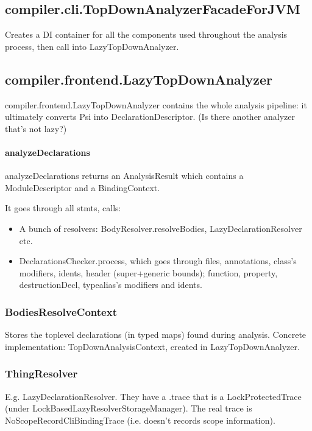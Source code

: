 \documentclass{article}
\begin{document}
\subsection{compiler.cli.TopDownAnalyzerFacadeForJVM}

Creates a DI container for all the components used throughout the analysis process, then call into LazyTopDownAnalyzer.

\subsection{compiler.frontend.LazyTopDownAnalyzer}

compiler.frontend.LazyTopDownAnalyzer contains the whole analysis pipeline: it ultimately converts Psi into DeclarationDescriptor. (Is there another analyzer that's not lazy?)

\paragraph{analyzeDeclarations}

analyzeDeclarations returns an AnalysisResult which contains a ModuleDescriptor and a BindingContext.

It goes through all stmts, calls:
\begin{itemize}
    \item A bunch of resolvers: BodyResolver.resolveBodies, LazyDeclarationResolver etc.
    \item DeclarationsChecker.process, which goes through files, annotations, class's modifiers, idents, header (super+generic bounds); function, property, destructionDecl, typealias's modifiers and idents.
\end{itemize}

\subsubsection{BodiesResolveContext}

Stores the toplevel declarations (in typed maps) found during analysis. Concrete implementation: TopDownAnalysisContext, created in LazyTopDownAnalyzer.

\subsubsection{ThingResolver}
E.g. LazyDeclarationResolver. They have a .trace that is a LockProtectedTrace (under LockBasedLazyResolverStorageManager). The real trace is NoScopeRecordCliBindingTrace (i.e. doesn't records scope information).
\end{document}
